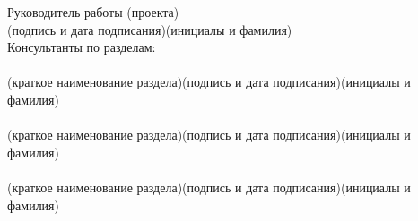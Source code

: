 \begin{titlepage}
\begin{flushleft}
Руководитель работы (проекта) \underline{\hspace{5cm}}\hfill\underline{\hspace{4cm}}\\
\vspace{-.2cm}\hspace{7.3cm}\footnotesize(подпись и дата подписания)\hspace{2.2cm}(инициалы и фамилия)\normalsize\\
Консультанты по разделам:\\
\underline{\hspace{7.5cm}}\hspace{1cm}\underline{\hspace{4cm}}\hspace{1cm}\underline{\hspace{4cm}}\\
\vspace{-.2cm}\hspace{1.5cm}\footnotesize(краткое наименование раздела)\hspace{2cm}(подпись и дата подписания)\hspace{1.1cm}(инициалы и фамилия)\normalsize\\
\underline{\hspace{7.5cm}}\hspace{1cm}\underline{\hspace{4cm}}\hspace{1cm}\underline{\hspace{4cm}}\\
\vspace{-.2cm}\hspace{1.5cm}\footnotesize(краткое наименование раздела)\hspace{2cm}(подпись и дата подписания)\hspace{1.1cm}(инициалы и фамилия)\normalsize\\
\underline{\hspace{7.5cm}}\hspace{1cm}\underline{\hspace{4cm}}\hspace{1cm}\underline{\hspace{4cm}}\\
\vspace{-.2cm}\hspace{1.5cm}\footnotesize(краткое наименование раздела)\hspace{2cm}(подпись и дата подписания)\hspace{1.1cm}(инициалы и фамилия)\normalsize\\

\end{flushleft}
\end{titlepage}
